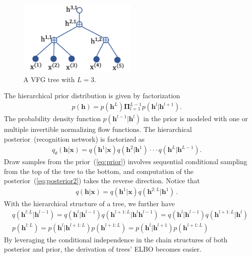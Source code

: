 \documentclass{article}
\begin{document}
\begin{figure}[H]
    \centering
    \includegraphics[width=2.3in]{fig/tree3.png}
    \caption{A VFG tree with $L=3$.}
    \label{fig:tree3}
\end{figure}

The hierarchical prior distribution is given by factorization
\begin{align}\label{eq:prior}
p(\mathbf{h}) =  p( \mathbf{h}^{L})\mathbf{\Pi}_{l=1}^{L-1}p(\mathbf{h}^{l} | \mathbf{h}^{l+1}) .
\end{align}
The probability density function $p(\mathbf{h}^{l-1} | \mathbf{h}^{l})$ in the prior is modeled with one or multiple invertible normalizing flow functions. The hierarchical posterior~(recognition network) is factorized as
\begin{align}\label{eq:posterior2}
q_{\theta}(\mathbf{h}| \mathbf{x}) =  q(\mathbf{h}^1 | \mathbf{x})  q(\mathbf{h}^2 | \mathbf{h}^1) \cdot \cdot  \cdot  q(\mathbf{h}^{L} | \mathbf{h}^{L-1}).
\end{align}
Draw samples from the prior~(\ref{eq:prior})
involves sequential conditional sampling from the top of the tree to the bottom, and computation of the posterior~(\ref{eq:posterior2}) takes the reverse direction. Notice that
\begin{align*} %
q(\mathbf{h}| \mathbf{x}) = q(\mathbf{h}^1 | \mathbf{x})  q(\mathbf{h}^{2:L} | \mathbf{h}^1) \, .
\end{align*}
With the hierarchical structure of a tree, we further have
\begin{align} \label{eq:chain_post}
&q(\mathbf{h}^{l:L}|\mathbf{h}^{l-1}) = q(\mathbf{h}^{l}|\mathbf{h}^{l-1}) q(\mathbf{h}^{l+1:L}|\mathbf{h}^{l}\mathbf{h}^{l-1})=q(\mathbf{h}^{l}|\mathbf{h}^{l-1}) q(\mathbf{h}^{l+1:L}|\mathbf{h}^{l})  \\ \label{eq:chain_prior}
& p(\mathbf{h}^{l:L})=  p(\mathbf{h}^{l}|\mathbf{h}^{l+1:L})p(\mathbf{h}^{l+1:L})=p(\mathbf{h}^{l}|\mathbf{h}^{l+1})p(\mathbf{h}^{l+1:L})
\end{align}
By leveraging  the conditional independence  in the chain structures of both posterior and prior, the derivation of trees' ELBO becomes easier.
\end{document}
